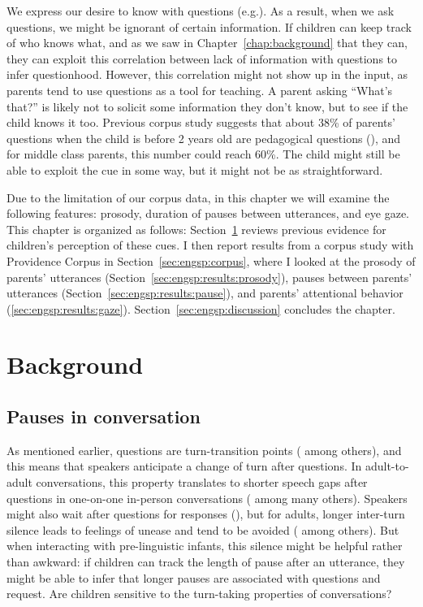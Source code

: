 We express our desire to know with questions (e.g.\cite{searle1975tax, krifka2011q, carruthers2018q}). As a result, when we ask questions, we might be ignorant of certain information. If children can keep track of who knows what, and as we saw in Chapter~\ref{chap:background} that they can, they can exploit this correlation between lack of information with questions to infer questionhood. However, this correlation might not show up in the input, as parents tend to use questions as a tool for teaching. A parent asking ``What's that?'' is likely not to solicit some information they don't know, but to see if the child knows it too. Previous corpus study suggests that about 38\% of parents' questions when the child is before 2 years old are pedagogical questions (\cite{yu2019pedagogical}), and for middle class parents, this number could reach 60\%. The child might still be able to exploit the cue in some way, but it might not be as straightforward.  

Due to the limitation of our corpus data, in this chapter we will examine the following features: prosody, duration of pauses between utterances, and eye gaze. This chapter is organized as follows: Section~\ref{sec:engsp:background} reviews previous evidence for children's perception of these cues. I then report results from a corpus study with Providence Corpus in Section~\ref{sec:engsp:corpus}, where I looked at the prosody of parents' utterances (Section~\ref{sec:engsp:results:prosody}), pauses between parents' utterances (Section~\ref{sec:engsp:results:pause}), and parents' attentional behavior (\ref{sec:engsp:results:gaze}).
Section~\ref{sec:engsp:discussion} concludes the chapter.


\section{Background}
\label{sec:engsp:background}
\subsection{Pauses in conversation}
\label{sec:engsp:bg:pause}
As mentioned earlier, questions are turn-transition points (\cite{duncan1972turn} among others), and this means that speakers anticipate a change of turn after questions. In adult-to-adult conversations, this property translates to shorter speech gaps after questions in one-on-one in-person conversations (\cite{stivers2010,enfield2010,hilbrink2013turn} among many others). Speakers might also wait after questions for responses (\cite{sacks1978pause}), but for adults, longer inter-turn silence leads to feelings of unease and tend to be avoided (\cite{roberts2006pause} among others). But when interacting with pre-linguistic infants, this silence might be helpful rather than awkward: if children can track the length of pause after an utterance, they might be able to infer that longer pauses are associated with questions and request. Are children sensitive to the turn-taking properties of conversations? 

